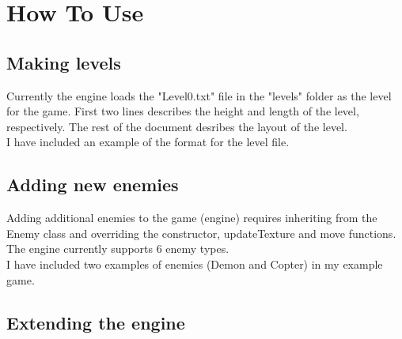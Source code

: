 \section{How To Use}

\subsection{Making levels}
Currently the engine loads the "Level0.txt" file in the "levels" folder as the level for the game. First two lines describes the height and length of the level, respectively. The rest of the document desribes the layout of the level.
\\I have included an example of the format for the level file.
\subsection{Adding new enemies}
Adding additional enemies to the game (engine) requires inheriting from the Enemy class and overriding the constructor, updateTexture and move functions. The engine currently supports 6 enemy types.
\\I have included two examples of enemies (Demon and Copter) in my example game.
\subsection{Extending the engine}
